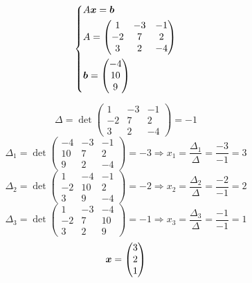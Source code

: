 \documentclass[a4paper,12pt]{article}
\begin{document}
  \begin{problem}[17.2(4)]
    \[
      \left\{
        \begin{aligned}
          &A \boldsymbol x = \boldsymbol b\\
          &A = \begin{pmatrix}
            1 & -3 & -1\\
            -2 & 7 & 2\\
            3 & 2 & -4
          \end{pmatrix}\\
          &\boldsymbol b = \begin{pmatrix}
            -4\\ 10\\ 9
          \end{pmatrix}
        \end{aligned}
      \right.
    \]
  \end{problem}
  
  \begin{solution}
    \[
      \Delta = \det \begin{pmatrix}
        1 & -3 & -1\\
        -2 & 7 & 2\\
        3 & 2 & -4
      \end{pmatrix} = -1
    \]
    \[
      \Delta_1 = \det \begin{pmatrix}
        -4 & -3 & -1\\
        10 & 7 & 2\\
        9 & 2 & -4
      \end{pmatrix} = -3 \Rightarrow x_1 = \frac{\Delta_1}{\Delta} = \frac{-3}{-1} = 3
    \]
    \[
      \Delta_2 = \det \begin{pmatrix}
        1 & -4 & -1\\
        -2 & 10 & 2\\
        3 & 9 & -4
      \end{pmatrix} = -2 \Rightarrow x_2 = \frac{\Delta_2}{\Delta} = \frac{-2}{-1} = 2
    \]
    \[
      \Delta_3 = \det \begin{pmatrix}
        1 & -3 & -4\\
        -2 & 7 & 10\\
        3 & 2 & 9
      \end{pmatrix} = -1 \Rightarrow x_3 = \frac{\Delta_3}{\Delta} = \frac{-1}{-1} = 1
    \]
    \[
      \boldsymbol x = \begin{pmatrix}
        3\\ 2\\ 1
      \end{pmatrix}
    \]
  \end{solution}
  
\end{document}
